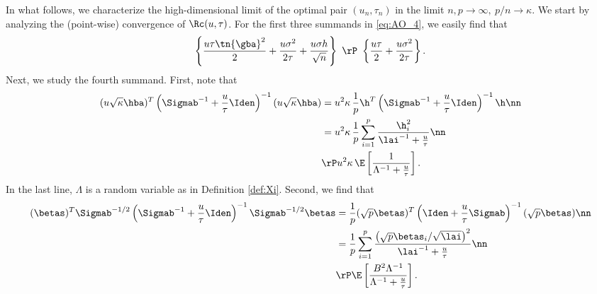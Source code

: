 In what follows, we characterize the high-dimensional limit of the optimal pair $(u_n,\tau_n)$ in the limit $n,p\rightarrow\infty,~p/n\rightarrow\kappa$.
We start by analyzing the (point-wise) convergence of $\Rc(u,\tau)$. 
For the first three summands in \eqref{eq:AO_4}, we easily find that
$$
\left\{\frac{u\tau\tn{\gba}^2}{2} + \frac{u\sigma^2}{2\tau} + \frac{u\sigma h}{\sqrt{n}}\right\}~ \rP~\left\{
\frac{u\tau}{2} + \frac{u\sigma^2}{2\tau} \right\}.
$$
Next, we study the fourth summand. First, note that
\begin{align}
(u\sqrt{\kappa}\hba)^T\left(\Sigmab^{-1}+\frac{u}{\tau}\Iden\right)^{-1}(u\sqrt{\kappa}\hba) &= u^2\kappa\,\frac{1}{p}\h^T\left(\Sigmab^{-1}+\frac{u}{\tau}\Iden\right)^{-1}\h \nn\\
&= u^2\kappa\,\frac{1}{p}\sum_{i=1}^{p}\frac{\h_i^2}{\lai^{-1}+\frac{u}{\tau}} \nn\\
&\rP u^2\kappa\,\E\left[ \frac{1}{\Lambda^{-1}+\frac{u}{\tau}} \right].
\end{align}
In the last line, $\Lambda$ is a random variable as in Definition \ref{def:Xi}.  
%
 Second, we find that
\begin{align}
(\betas)^T\Sigmab^{-1/2}\left(\Sigmab^{-1}+\frac{u}{\tau}\Iden\right)^{-1}\Sigmab^{-1/2}\betas &= \frac{1}{p}(\sqrt{p}\betas)^T\left(\Iden+\frac{u}{\tau}\Sigmab\right)^{-1}(\sqrt{p}\betas) \nn\\
&= \frac{1}{p}\sum_{i=1}^{p}\frac{\left(\sqrt{p}\betas_i/\sqrt{\lai}\right)^2}{\lai^{-1}+\frac{u}{\tau}}\nn\\
&\rP \E\left[\frac{B^2\Lambda^{-1}}{\Lambda^{-1}+\frac{u}{\tau}}\right].
\end{align}
